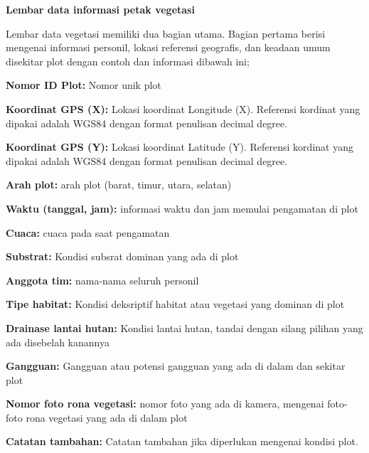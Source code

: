 \documentclass[
  oneside]{book}
\begin{document}
\textbf{Lembar data informasi petak vegetasi}

Lembar data vegetasi memiliki dua bagian utama. Bagian pertama berisi mengenai informasi personil, lokasi referensi geografis, dan keadaan umum disekitar plot dengan contoh dan informasi dibawah ini;

\textbf{Nomor ID Plot:} Nomor unik plot

\textbf{Koordinat GPS (X):} Lokasi koordinat Longitude (X). Referensi kordinat yang dipakai adalah WGS84 dengan format penulisan decimal degree.

\textbf{Koordinat GPS (Y):} Lokasi koordinat Latitude (Y). Referensi kordinat yang dipakai adalah WGS84 dengan format penulisan decimal degree.

\textbf{Arah plot:} arah plot (barat, timur, utara, selatan)

\textbf{Waktu (tanggal, jam):} informasi waktu dan jam memulai pengamatan di plot

\textbf{Cuaca:} cuaca pada saat pengamatan

\textbf{Substrat:} Kondisi subsrat dominan yang ada di plot

\textbf{Anggota tim:} nama-nama seluruh personil

\textbf{Tipe habitat:} Kondisi deksriptif habitat atau vegetasi yang dominan di plot

\textbf{Drainase lantai hutan:} Kondisi lantai hutan, tandai dengan silang pilihan yang ada disebelah kanannya

\textbf{Gangguan:} Gangguan atau potensi gangguan yang ada di dalam dan sekitar plot

\textbf{Nomor foto rona vegetasi:} nomor foto yang ada di kamera, mengenai foto-foto rona vegetasi yang ada di dalam plot

\textbf{Catatan tambahan:} Catatan tambahan jika diperlukan mengenai kondisi plot.
\end{document}
